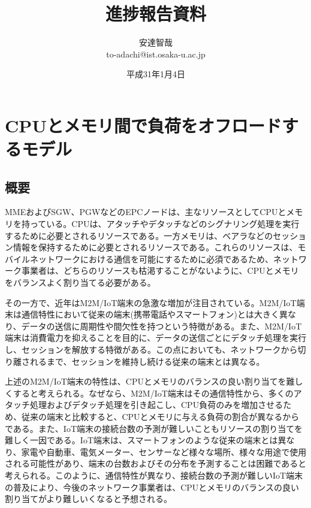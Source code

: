 \documentclass[a4j]{ujarticle}
\title{進捗報告資料}
\author{安達智哉\\to-adachi@ist.osaka-u.ac.jp}
\date{平成31年1月4日}
\begin{document}
\maketitle

\section{CPUとメモリ間で負荷をオフロードするモデル}

\subsection{概要}
\label{sec:abs}
MMEおよびSGW、PGWなどのEPCノードは、主なリソースとしてCPUとメモリを持っている。CPUは、アタッチやデタッチなどのシグナリング処理を実行するために必要とされるリソースである。一方メモリは、ベアラなどのセッション情報を保持するために必要とされるリソースである。これらのリソースは、モバイルネットワークにおける通信を可能にするために必須であるため、ネットワーク事業者は、どちらのリソースも枯渇することがないように、CPUとメモリをバランスよく割り当てる必要がある。

その一方で、近年はM2M/IoT端末の急激な増加が注目されている。M2M/IoT端末は通信特性において従来の端末(携帯電話やスマートフォン)とは大きく異なり、データの送信に周期性や間欠性を持つという特徴がある。また、M2M/IoT端末は消費電力を抑えることを目的に、データの送信ごとにデタッチ処理を実行し、セッションを解放する特徴がある。この点においても、ネットワークから切り離されるまで、セッションを維持し続ける従来の端末とは異なる。

上述のM2M/IoT端末の特性は、CPUとメモリのバランスの良い割り当てを難しくすると考えられる。なぜなら、M2M/IoT端末はその通信特性から、多くのアタッチ処理およびデタッチ処理を引き起こし、CPU負荷のみを増加させるため、従来の端末と比較すると、CPUとメモリに与える負荷の割合が異なるからである。また、IoT端末の接続台数の予測が難しいこともリソースの割り当てを難しく一因である。IoT端末は、スマートフォンのような従来の端末とは異なり、家電や自動車、電気メーター、センサーなど様々な場所、様々な用途で使用される可能性があり、端末の台数およびその分布を予測することは困難であると考えられる。このように、通信特性が異なり、接続台数の予測が難しいIoT端末の普及により、今後のネットワーク事業者は、CPUとメモリのバランスの良い割り当てがより難しいくなると予想される。
\end{document}
